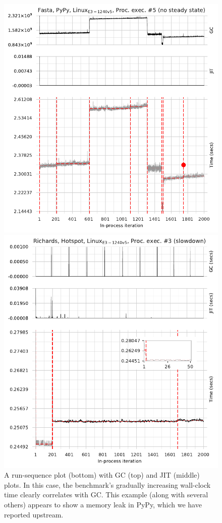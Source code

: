 \documentclass[acmsmall,screen]{acmart}
\begin{document}
\begin{figure}[!tbp]
\centering
\begin{minipage}[t]{0.485\textwidth}
\includegraphics[width=\textwidth]{examples/new_good_comp.pdf}
\caption{A run-sequence plot (bottom) with GC (top) and JIT (middle) plots.
In this case, the benchmark's gradually increasing wall-clock time clearly
correlates with GC. This example (along with several others) appears to show a
memory leak in PyPy, which we have reported upstream.}
\label{fig:goodcomp}
\end{minipage}
\hfill
\begin{minipage}[t]{0.485\textwidth}
\includegraphics[width=\textwidth]{examples/new_miscomp.pdf}

\end{minipage}
\end{figure}
\end{document}
